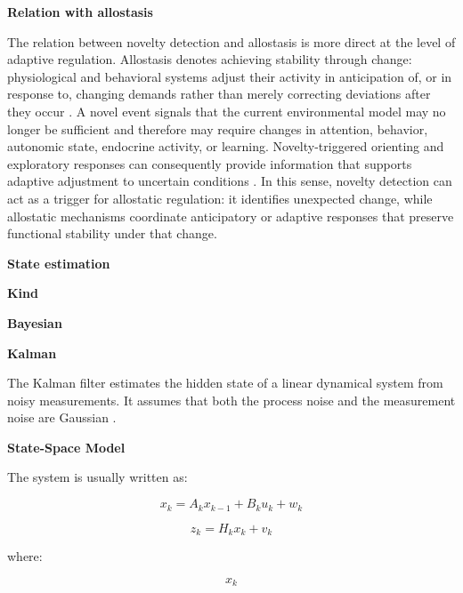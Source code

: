 \documentclass{book}
\providecommand{\ProjectDeepHeading}[2]{%
    \par\medskip\noindent\textbf{#2}\par\smallskip
}
\begin{document}
   \ProjectDeepHeading{8}{Relation with allostasis}
   The relation between novelty detection and allostasis is more direct at the level of adaptive regulation. Allostasis denotes achieving stability through change: physiological and behavioral systems adjust their activity in anticipation of, or in response to, changing demands rather than merely correcting deviations after they occur \cite{mcewen-1998-stress-adaptation-and-disease-allostasis-and-allostatic-load,sterling-2012-allostasis-a-model-of-predictive-regulation}. A novel event signals that the current environmental model may no longer be sufficient and therefore may require changes in attention, behavior, autonomic state, endocrine activity, or learning. Novelty-triggered orienting and exploratory responses can consequently provide information that supports adaptive adjustment to uncertain conditions \cite{ranganath-rainer-2003-neural-mechanisms-for-detecting-and-remembering-novel-events,tapper-molas-2020-midbrain-circuits-of-novelty-processing}. In this sense, novelty detection can act as a trigger for allostatic regulation: it identifies unexpected change, while allostatic mechanisms coordinate anticipatory or adaptive responses that preserve functional stability under that change.

\ProjectDeepHeading{5}{State estimation}

\ProjectDeepHeading{6}{Kind}

\ProjectDeepHeading{7}{Bayesian}

\ProjectDeepHeading{8}{Kalman}


The Kalman filter estimates the hidden state of a linear dynamical system from noisy measurements. It assumes that both the process noise and the measurement noise are Gaussian \cite{kalman-1960-a-new-approach-to-linear-filtering-and-prediction-problems}.
    
    
    \ProjectDeepHeading{11}{State-Space Model}
        
        The system is usually written as:
        
        \[
            x_k = A_k x_{k-1} + B_k u_k + w_k
        \]
        
        \[
            z_k = H_k x_k + v_k
        \]
        
        where:
        
        \[
            x_k
        \]
        
\end{document}
